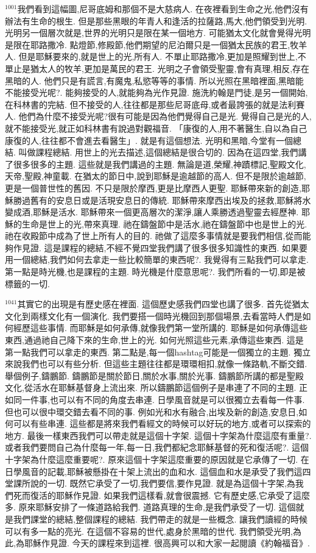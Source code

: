 \documentclass{book}
\begin{document}
$^{1001}$我們看到這幅圖,尼哥底姆和那個不是大慈病人.
在夜裡看到生命之光,他們沒有辦法有生命的根生.
但是那些黑眼的年青人和逢活的拉薩路,馬大,他們領受到光明.
光明另一個層次就是,世界的光明只是限在某一個地方.
可能猶太文化就會覺得光明是限在耶路撒冷.
點燈節,修殿節,他們期望的尼泊爾只是一個猶太民族的君王,牧羊人.
但是耶穌要來的,就是世上的光,所有人.
不單止耶路撒冷,更加是照耀到世上,不單止是猶太人的牧羊,更加是萬民的君王.
光明之子會領受聖靈,會有真理,相反,存在黑暗的人.
他們只是有謊言,有魔鬼,私慾等等的事情.
所以光照在黑暗裡面,黑暗能不能接受光呢?.
能夠接受的人,就能夠為光作見證.
施洗約翰是門徒,是另一個開始,在科林書的完結.
但不接受的人,往往都是那些尼哥底母,或者最誇張的就是法利賽人.
他們為什麼不接受光呢?很有可能是因為他們覺得自己是光.
覺得自己是光的人,就不能接受光,就正如科林書有說過對觀福音.
「康復的人,用不著醫生,自以為自己康復的人,往往都不會進去看醫生」.
就是有這個想法.
光明和黑暗,今堂有一個總結.
叫做課程總結.
用世上的光去描述,這個總結是很合切的.
因為在這四堂,我們講了很多很多的主題.
這些就是我們講過的主題.
無論是道,榮耀,神蹟標記,聖殿文化,天帝,聖殿,神童載.
在猶太的節日中,說到耶穌是逾越節的高人.
但不是限於逾越節,更是一個普世性的舊因.
不只是限於摩西,更是比摩西人更聖.
耶穌帶來新的創造,耶穌勝過舊有的安息日或是活現安息日的傳統.
耶穌帶來摩西出埃及的拯救,耶穌將水變成酒,耶穌是活水.
耶穌帶來一個更高層次的潔淨,讓人乘勝透過聖靈去經歷神.
耶穌的生命是世上的光,帶來真理.
祂在鑄盤節中是活水,祂在鑄盤節中也是世上的光.
祂在收殿節中成為了世上所有人的目的.
祂做了這麼多事情就是要我們相信,從而能夠作見證.
這是課程的總結,不經不覺四堂我們講了很多很多知識性的東西.
如果要用一個總結,我們如何去拿走一些比較簡單的東西呢?.
我覺得有三點我們可以拿走.
第一點是時光機,也是課程的主題.
時光機是什麼意思呢?.
我們所看的一切,即是被標籤的一切.

$^{1041}$其實它的出現是有歷史感在裡面.
這個歷史感我們四堂也講了很多.
首先從猶太文化到兩樣文化有一個演化.
我們要搭一個時光機回到那個場景,去看當時人們是如何經歷這些事情.
而耶穌是如何承傳,就像我們第一堂所講的.
耶穌是如何承傳這些東西,通過祂自己降下來的生命,世上的光.
如何光照這些元素,承傳這些東西.
這是第一點我們可以拿走的東西.
第二點是,每一個hashtag可能是一個獨立的主題.
獨立來說我們也可以有些分析.
但這些主題往往都是環環相扣,就像一條路軌,不斷交錯.
舉個例子,鑄鵬節.
鑄鵬節是關於節日,關於水事,關於光事.
鑄鵬節所講的都是聖殿文化,從活水在耶穌基督身上流出來.
所以鑄鵬節這個例子是串連了不同的主題.
正如同一件事,也可以有不同的角度去串連.
日學風音就是可以很獨立去看每一件事.
但也可以很中環交錯去看不同的事.
例如光和水有融合,出埃及新的創造,安息日,如何可以有些串連.
這些都是將來我們看經文的時候可以好玩的地方,或者可以探索的地方.
最後一樣東西我們可以帶走就是這個十字架.
這個十字架為什麼這麼有重量?.
或者我們要問自己為什麼每一年,每一日,我們都紀念耶穌基督的死和復活呢?.
這個十字架為什麼這麼重要呢?.
原來這個十字架這麼重要的原因就是它承傳了一切.
在日學風音的記載,耶穌被懸掛在十架上流出的血和水.
這個血和水是承受了我們這四堂課所說的一切.
既然它承受了一切,我們要信,要作見證.
就是為這個十字架,為我們死而復活的耶穌作見證.
如果我們這樣看,就會很震撼.
它有歷史感,它承受了這麼多.
原來耶穌安排了一條道路給我們.
道路真理的生命,是我們承受了一切.
這個就是我們課堂的總結,整個課程的總結.
我們帶走的就是一些概念.
讓我們讀經的時候可以有多一點的亮光.
在這個不容易的世代,處身於黑暗的世代.
我們領受光明,為此,為耶穌作見證.
今天的課程來到這裡.
很高興可以和大家一起閱讀《約翰福音》.
\end{document}
